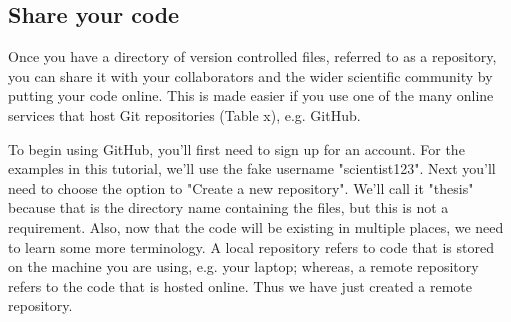 \subsection{Share your code}

Once you have a directory of version controlled files, referred to as a repository, you can share it with your collaborators and the wider scientific community by putting your code online.
This is made easier if you use one of the many online services that host Git repositories (Table x), e.g. GitHub.

To begin using GitHub, you'll first need to sign up for an account.
For the examples in this tutorial, we'll use the fake username "scientist123".
Next you'll need to choose the option to "Create a new repository".
We'll call it "thesis" because that is the directory name containing the files, but this is not a requirement.
Also, now that the code will be existing in multiple places, we need to learn some more terminology.
A local repository refers to code that is stored on the machine you are using, e.g. your laptop; whereas, a remote repository refers to the code that is hosted online.
Thus we have just created a remote repository.

